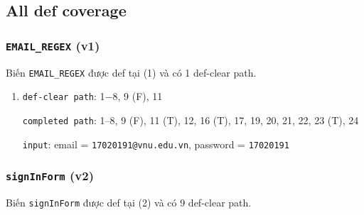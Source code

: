 \documentclass{article}
\begin{document}
\subsection{All def coverage}

\subsubsection*{\texttt{EMAIL\_REGEX} (v1)}

\par Biến \texttt{EMAIL\_REGEX} được def tại (1) và có 1 def-clear path.

\begin{enumerate}
    \item \texttt{def-clear path}: 1$-$8, 9 (F), 11
          \par \texttt{completed path}: 1–8, 9 (F), 11 (T), 12, 16 (T), 17, 19, 20, 21, 22, 23 (T), 24
          \par \texttt{input}: email = \texttt{17020191@vnu.edu.vn}, password = \texttt{17020191}
\end{enumerate}

\subsubsection*{\texttt{signInForm} (v2)}

\par Biến \texttt{signInForm} được def tại (2) và có 9 def-clear path.
\end{document}
